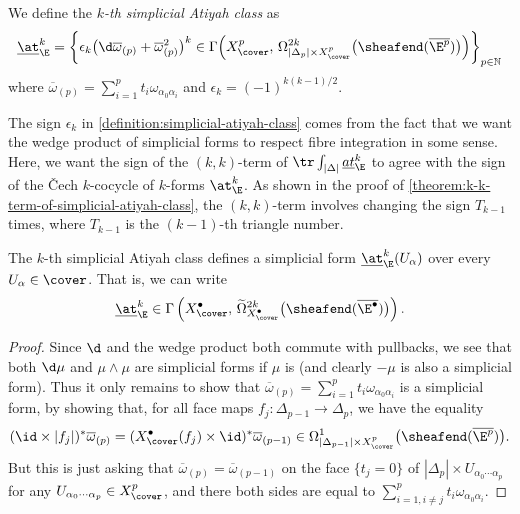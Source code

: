         \begin{definition}\label{definition:simplicial-atiyah-class}
            We define the \emph{$k$-th simplicial Atiyah class} as
            \[
                \underline{\at}^k_\E = \bigg\{\epsilon_k\big(\d\overline{\omega}_{(p)} + \overline{\omega}_{(p)}^2\big)^k \in \Gamma\Big(X^p_\cover,\,\Omega_{|\Delta_p|\times X^p_\cover}^{2k}\big(\sheafend(\overline{\E^p})\big)\Big)\bigg\}_{p\in\mathbb{N}}
            \]
            where $\overline{\omega}_{(p)} = \sum_{i=1}^p t_i\omega_{\alpha_0\alpha_i}$ and $\epsilon_k=(-1)^{k(k-1)/2}$.
        \end{definition}

        \begin{note}\label{note:sign-in-simplicial-atiyah-class}
            The sign $\epsilon_k$ in \cref{definition:simplicial-atiyah-class} comes from the fact that we want the wedge product of simplicial forms to respect fibre integration in some sense.
            Here, we want the sign of the $(k,k)$-term of $\tr\int_{|\Delta|}\underline{at}^k_\E$ to agree with the sign of the Čech $k$-cocycle of $k$-forms $\at^k_\E$.
            As shown in the proof of \cref{theorem:k-k-term-of-simplicial-atiyah-class}, the $(k,k)$-term involves changing the sign $T_{k-1}$ times, where $T_{k-1}$ is the $(k-1)$-th triangle number.
        \end{note}

        \begin{theorem}
            The $k$-th simplicial Atiyah class defines a simplicial form $\underline{\at}_\E^k(U_\alpha)$ over every $U_{\alpha}\in\cover$.
            That is, we can write
            \[
                \underline{\at}_\E^k \in \Gamma\left(X^\bullet_\cover,\,\widetilde{\Omega}^{2k}_{X^\bullet_\cover}\big(\sheafend(\overline{\E^\bullet})\big)\right).\qedhere
            \]
        \end{theorem}

        \begin{proof}
            Since $\d$ and the wedge product both commute with pullbacks, we see that both $\d\mu$ and $\mu\wedge\mu$ are simplicial forms if $\mu$ is (and clearly $-\mu$ is also a simplicial form).
            Thus it only remains to show that $\overline{\omega}_{(p)}=\sum_{i=1}^p t_i\omega_{\alpha_0\alpha_i}$ is a simplicial form, by showing that, for all face maps $f_j\colon\Delta_{p-1}\to\Delta_p$, we have the equality
            \[
                (\id\times|f_j|)^*\overline{\omega}_{(p)} = (X^\bullet_\cover(f_j)\times\id)^*\overline{\omega}_{(p-1)} \in \Omega^1_{|\Delta_{p-1}|\times X^p_\cover}\big(\sheafend(\overline{\E^p})\big).
            \]
            But this is just asking that $\overline{\omega}_{(p)} = \overline{\omega}_{(p-1)}$ on the face $\{t_j=0\}$ of $|\Delta_p|\times U_{\alpha_0\cdots\alpha_p}$ for any $U_{\alpha_0\cdots\alpha_p}\in X^p_\cover$, and there both sides are equal to $\sum_{i=1,i\neq j}^p t_i\omega_{\alpha_0\alpha_i}$.
        \end{proof}

